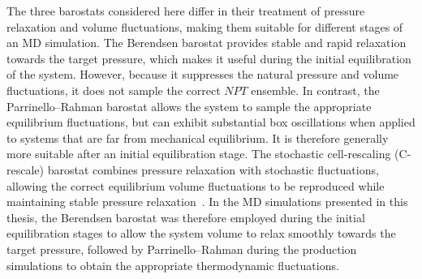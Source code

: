 The three barostats considered here differ in their treatment of pressure relaxation and volume fluctuations, making them suitable for different stages of an MD simulation. The Berendsen barostat provides stable and rapid relaxation towards the target pressure, which makes it useful during the initial equilibration of the system. However, because it suppresses the natural pressure and volume fluctuations, it does not sample the correct $NPT$ ensemble. In contrast, the Parrinello--Rahman barostat allows the system to sample the appropriate equilibrium fluctuations, but can exhibit substantial box oscillations when applied to systems that are far from mechanical equilibrium. It is therefore generally more suitable after an initial equilibration stage. The stochastic cell-rescaling (C-rescale) barostat combines pressure relaxation with stochastic fluctuations, allowing the correct equilibrium volume fluctuations to be reproduced while maintaining stable pressure relaxation~\cite{Gromacs2015,CRB}.
In the MD simulations presented in this thesis, the Berendsen barostat was therefore employed during the initial equilibration stages to allow the system volume to relax smoothly towards the target pressure, followed by Parrinello--Rahman during the production simulations to obtain the appropriate thermodynamic fluctuations.




